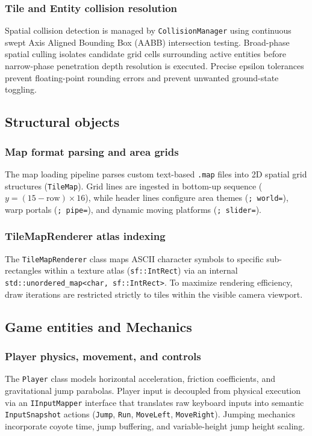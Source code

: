 \documentclass[12pt, a4paper]{article}
\begin{document}
\subsubsection{Tile and Entity collision resolution}
Spatial collision detection is managed by \texttt{CollisionManager} using continuous swept Axis Aligned Bounding Box (AABB) intersection testing. Broad-phase spatial culling isolates candidate grid cells surrounding active entities before narrow-phase penetration depth resolution is executed. Precise epsilon tolerances prevent floating-point rounding errors and prevent unwanted ground-state toggling.

\subsection{Structural objects}

\subsubsection{Map format parsing and area grids}
The map loading pipeline parses custom text-based \texttt{.map} files into 2D spatial grid structures (\texttt{TileMap}). Grid lines are ingested in bottom-up sequence ($y = (15 - \text{row}) \times 16$), while header lines configure area themes (\texttt{; world=}), warp portals (\texttt{; pipe=}), and dynamic moving platforms (\texttt{; slider=}).

\subsubsection{TileMapRenderer atlas indexing}
The \texttt{TileMapRenderer} class maps ASCII character symbols to specific sub-rectangles within a texture atlas (\texttt{sf::IntRect}) via an internal \texttt{std::unordered\_map<char, sf::IntRect>}. To maximize rendering efficiency, draw iterations are restricted strictly to tiles within the visible camera viewport.

\subsection{Game entities and Mechanics}

\subsubsection{Player physics, movement, and controls}
The \texttt{Player} class models horizontal acceleration, friction coefficients, and gravitational jump parabolas. Player input is decoupled from physical execution via an \texttt{IInputMapper} interface that translates raw keyboard inputs into semantic \texttt{InputSnapshot} actions (\texttt{Jump}, \texttt{Run}, \texttt{MoveLeft}, \texttt{MoveRight}). Jumping mechanics incorporate coyote time, jump buffering, and variable-height jump height scaling.
\end{document}
